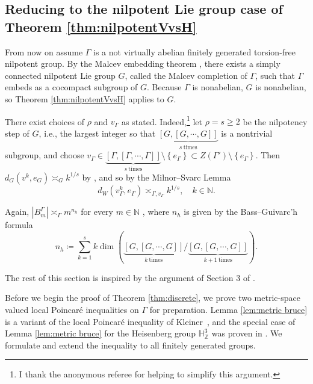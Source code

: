 \documentclass[11pt,reqno]{amsart}
\newcommand{\1}{\mathbf 1}
\begin{document}
\subsection{Reducing to the nilpotent Lie group case of Theorem \ref{thm:nilpotentVvsH}}
From now on assume $\Gamma$ is a not virtually abelian finitely generated torsion-free nilpotent group. By the Malcev embedding theorem \cite{malcev1949class}, there exists a simply connected nilpotent Lie group $G$, called the Malcev completion of $\Gamma$, such that $\Gamma$ embeds as a cocompact subgroup of $G$. Because $\Gamma$ is nonabelian, $G$ is nonabelian, so Theorem \ref{thm:nilpotentVvsH} applies to $G$.

There exist choices of $\rho$ and $v_\Gamma$ as stated. Indeed,\footnote{I thank the anonymous referee for helping to simplify this argument.} let $\rho=s\ge 2$ be the nilpotency step of $G$, i.e., the largest integer so that $\underbrace{\left[G,\left[G,\cdots,G\right]\right]}_{s \mathrm{~times}}$ is a nontrivial subgroup, and choose $v_\Gamma\in \underbrace{\left[\Gamma,\left[\Gamma,\cdots,\Gamma\right]\right]}_{s \mathrm{~times}}\setminus \left\{e_\Gamma\right\}\subset Z\left(\Gamma'\right)\setminus\left\{e_\Gamma\right\}$. Then $d_G\left(v^k,e_G\right)\asymp_G k^{1/s}$ by \cite[Proposition 2.13]{breuillard2012nilpotent}, and so by the Milnor--Svarc Lemma
\[
d_W\left(v_\Gamma^k,e_\Gamma\right)\asymp_{\Gamma,v_\Gamma} k^{1/s},\quad k\in \mathbb{N}.
\]

Again, $\left|B^\Gamma_m\right|\asymp_\Gamma m^{n_h}$ for every $m\in \mathbb{N}$ \cite[Theorem 1.1]{breuillard2012nilpotent}, where $n_h$ is given by the Bass--Guivarc'h formula
\[
n_h\coloneqq \sum_{k=1}^s k\operatorname{dim}\left(\underbrace{\left[G,\left[G,\cdots,G\right]\right]}_{k \mathrm{~times}}/\underbrace{\left[G,\left[G,\cdots,G\right]\right]}_{k+1 \mathrm{~times}}\right).
\]


The rest of this section is inspired by the argument of Section 3 of \cite{lafforgue2014vertical}.


Before we begin the proof of Theorem \ref{thm:discrete}, we prove two metric-space valued local Poincar\'e inequalities on $\Gamma$ for preparation. Lemma \ref{lem:metric bruce} is a variant of the local Poincar\'e inequality of Kleiner~\cite[Theorem~2.2]{kleiner2010new}, and the special case of Lemma \ref{lem:metric bruce} for the Heisenberg group $\mathbb{H}^3_\mathbb{Z}$ was proven in \cite[Lemma 3.2]{lafforgue2014vertical}. We formulate and extend the inequality to all finitely generated groups.
\end{document}
